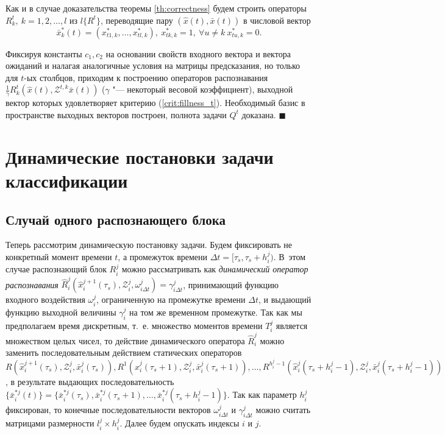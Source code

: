 \documentclass[a4paper, 12pt]{article}
\theoremstyle{plain}
\newenvironment{Proof}%
	{\par\noindent{\bf Доказательство.}}%
	{\hfill$\scriptstyle\blacksquare$}
\begin{document}
	\begin{Proof}
		Как и в случае доказательства теоремы \ref{th:correctness} будем строить операторы $R_k^t,\ k=1,2,\dots,l$ из $l\{R^t\}$, переводящие пару $(\hat x(t), \bar x(t))$ в числовой вектор
		\begin{equation}\label{crit:fillness_t}
			\bar x_k^*(t)=(x_{t1,k}^*,\dots,x_{tl,k}^*),\ x_{tk,k}^*=1,\ \forall u\neq k\ x_{tu,k}^*=0.
		\end{equation}
		
		Фиксируя константы $c_1,c_2$ на основании свойств входного вектора и вектора ожиданий и налагая аналогичные условия на матрицы предсказания, но только для $t$-ых столбцов, приходим к построению операторов распознавания $\frac{1}{\gamma}R_k^t(\hat x(t),\mathcal Z^{t,k} \bar x(t))$ ($\gamma$ "--- некоторый весовой коэффициент), выходной вектор которых удовлетворяет критерию (\ref{crit:fillness_t}). Необходимый базис в пространстве выходных векторов построен, полнота задачи $Q^t$ доказана.
	\end{Proof}
	
	\section{Динамические постановки задачи классификации}
	\subsection{Случай одного распознающего блока}
	Теперь рассмотрим динамическую постановку задачи. Будем фиксировать не конкретный момент времени $t$, а промежуток времени ${\Delta}t=[\tau_s,\tau_s+h_i^j)$. В~этом случае распознающий блок $R_i^j$ можно рассматривать как \textit{динамический оператор распознавания} $\hat{R}_i^j(\hat{x}_i^{j+1}(\tau_s), \mathcal{Z}_i^j, \omega_{i\Delta{t}}^j)=\gamma_{i\Delta{t}}^j$, принимающий  функцию входного воздействия $\omega_i^j$, ограниченную на промежутке времени ${\Delta}t$, и выдающий функцию выходной величины $\gamma_i^j$ на том же временном промежутке. Так как мы предполагаем время дискретным, т.~е. множество моментов времени $T_i^j$ является множеством целых чисел, то действие динамического оператора $\hat{R}_i^j$ можно заменить последовательным действием статических операторов $R(\hat{x}_i^{j+1}(\tau_s), \mathcal{Z}_i^j, \bar{x}_i^j(\tau_s)), R^1(\hat{x}_i^j(\tau_s+1), \mathcal{Z}_i^j, \bar{x}_i^j(\tau_s+1)), \dots, R^{h_i^j-1}(\hat{x}_i^j(\tau_s+h_i^j-1), \mathcal{Z}_i^j, \bar{x}_i^j(\tau_s+h_i^j-1))$, в результате выдающих последовательность $\{\bar{x}_i^{*j}(t)\}=\{\bar{x}_i^{*j}(\tau_s), \bar{x}_i^{*j}(\tau_s+1), \dots, \bar{x}_i^{*j}(\tau_s+h_i^j-1)\}$. Так как параметр $h_i^j$ фиксирован, то конечные последовательности векторов  $\omega_{i\Delta{t}}^j$ и $\gamma_{i\Delta{t}}^j$ можно считать матрицами размерности $l_i^j\times{h_i^j}$. Далее будем опускать индексы $i$ и $j$.
	
\end{document}
